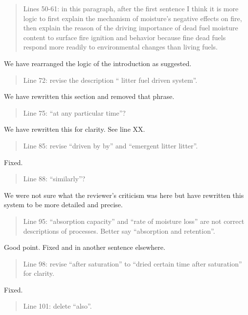 \documentclass[letterpaper, 12pt]{letter}
\begin{document}
\begin{letter}{}
\begin{quote}
Lines 50-61: in this paragraph, after the first sentence I think it is more logic to first explain the mechanism of moisture’s negative effects on fire, then explain the reason of the driving importance of dead fuel moisture content to surface fire ignition and behavior because fine dead fuels respond more readily to environmental changes than living fuels.
\end{quote}

We have rearranged the logic of the introduction as suggested.

\begin{quote}
Line 72: revise the description “ litter fuel driven system”.
\end{quote}

We have rewritten this section and removed that phrase.

\begin{quote}
Line 75: “at any particular time”?
\end{quote}

We have rewritten this for clarity. See line XX.

\begin{quote}
Line 85: revise “driven by by” and “emergent litter litter”.
\end{quote}

Fixed.

\begin{quote}
Line 88: “similarly”?
\end{quote}

We were not sure what the reviewer's criticism was here but have rewritten this system to be more detailed and precise.

\begin{quote}
Line 95: “absorption capacity” and “rate of moisture loss” are not correct descriptions of processes. Better say “absorption and retention”.
\end{quote}

Good point. Fixed and in another sentence elsewhere.

\begin{quote}
Line 98: revise “after saturation” to “dried certain time after saturation” for clarity.
\end{quote}

Fixed.

\begin{quote}
Line 101: delete “also”.
\end{quote}


\end{letter}
\end{document}
